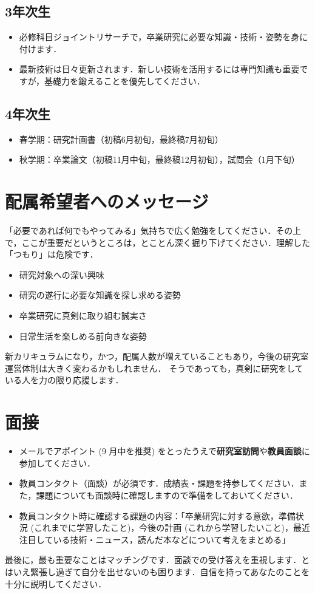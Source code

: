 \documentclass[a4paper,uplatex,dvipdfm]{bxjsarticle}
\begin{document}
\subsection*{3年次生}
\vspace{-.3cm}
\begin{itemize}
  \item 必修科目ジョイントリサーチで，卒業研究に必要な知識・技術・姿勢を身に付けます．
  \item 最新技術は日々更新されます．新しい技術を活用するには専門知識も重要ですが，基礎力を鍛えることを優先してください．
\end{itemize}
\vspace{-.3cm}
\subsection*{4年次生}
\vspace{-.3cm}
\begin{itemize}
  \item 春学期：研究計画書（初稿6月初旬，最終稿7月初旬）
  \item 秋学期：卒業論文（初稿11月中旬，最終稿12月初旬），試問会（1月下旬）
\end{itemize}
\section{配属希望者へのメッセージ}

「必要であれば何でもやってみる」気持ちで広く勉強をしてください．その上で，ここが重要だというところは，とことん深く掘り下げてください．理解した「つもり」は危険です．
\begin{itemize}
  \item 研究対象への深い興味
  \item 研究の遂行に必要な知識を探し求める姿勢
  \item 卒業研究に真剣に取り組む誠実さ
  \item 日常生活を楽しめる前向きな姿勢
\end{itemize}

新カリキュラムになり，かつ，配属人数が増えていることもあり，今後の研究室運営体制は大きく変わるかもしれません．
そうであっても，真剣に研究をしている人を力の限り応援します．

\section{面接}

\begin{itemize}
  \item メールでアポイント (9 月中を推奨) をとったうえで{\bfseries 研究室訪問}や{\bfseries 教員面談}に参加してください．
  \item 教員コンタクト（面談）が必須です．成績表・課題を持参してください．また，課題についても面談時に確認しますので準備をしておいてください．
  \item 教員コンタクト時に確認する課題の内容：「卒業研究に対する意欲，準備状況 (これまでに学習したこと)，今後の計画 (これから学習したいこと)，最近注目している技術・ニュース，読んだ本などについて考えをまとめる」
\end{itemize}

最後に，最も重要なことはマッチングです．面談での受け答えを重視します．とはいえ緊張し過ぎて自分を出せないのも困ります．自信を持ってあなたのことを十分に説明してください．

%
%
\end{document}
